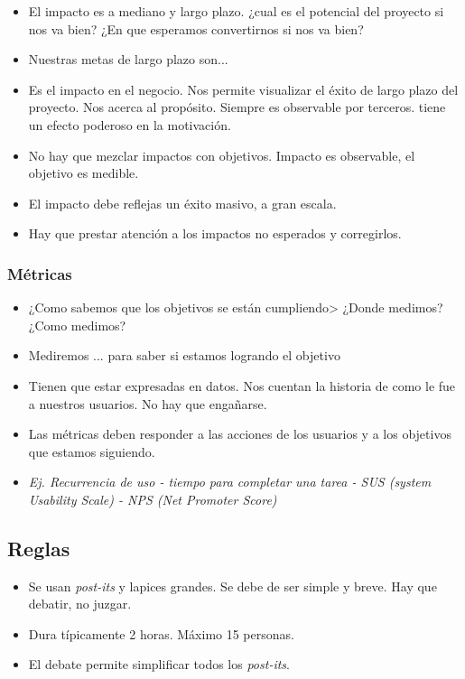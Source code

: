 \documentclass[titlepage,a4paper]{article}
\begin{document}
\begin{itemize}
    \item El impacto es a mediano y largo plazo. ¿cual es el potencial del proyecto si nos va bien? ¿En que esperamos convertirnos si nos va bien?
    \item Nuestras metas de largo plazo son...
    \item Es el impacto en el negocio. Nos permite visualizar el éxito de largo plazo del proyecto. Nos acerca al propósito. Siempre es observable por terceros. tiene un efecto poderoso en la motivación.
    \item No hay que mezclar impactos con objetivos. Impacto es observable, el objetivo es medible.
    \item El impacto debe reflejas un éxito masivo, a gran escala.
    \item Hay que prestar atención a los impactos no esperados y corregirlos.
\end{itemize}

\subsubsection*{Métricas}

\begin{itemize}
    \item ¿Como sabemos que los objetivos se están cumpliendo> ¿Donde medimos? ¿Como medimos?
    \item Mediremos ... para saber si estamos logrando el objetivo
    \item Tienen que estar expresadas en datos. Nos cuentan la historia de como le fue a nuestros usuarios. No hay que engañarse.
    \item Las métricas deben responder a las acciones de los usuarios y a los objetivos que estamos siguiendo.
    \item \textit{Ej. Recurrencia de uso - tiempo para completar una tarea - SUS (system Usability Scale) - NPS (Net Promoter Score)}
\end{itemize}

\subsection{Reglas}
\begin{itemize}
    \item Se usan \textit{post-its} y lapices grandes. Se debe de ser simple y breve. Hay que debatir, no juzgar.
    \item Dura típicamente 2 horas. Máximo 15 personas.
    \item El debate permite simplificar todos los \emph{post-its}.
\end{itemize}
\end{document}
